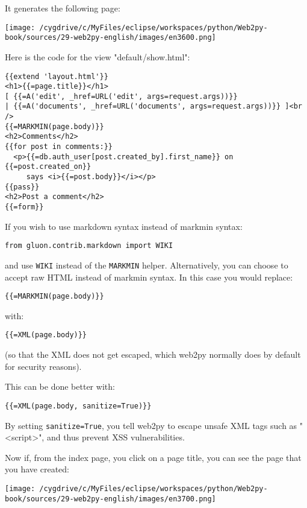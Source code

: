 \documentclass[justified,sixbynine,notoc]{tufte-book}
\def\ft{\small\tt}
\def\inxx#1{\index{#1}}
\begin{document}
\begin{fullwidth}
It generates the following page:


\goodbreak\begin{center}\texttt{[image: /cygdrive/c/MyFiles/eclipse/workspaces/python/Web2py-book/sources/29-web2py-english/images/en3600.png]}\end{center}


Here is the code for the view "default/show.html":

\inxx{markdown} \inxx{MARKMIN}
\begin{lstlisting}[keywords={}]
{{extend 'layout.html'}}
<h1>{{=page.title}}</h1>
[ {{=A('edit', _href=URL('edit', args=request.args))}}
| {{=A('documents', _href=URL('documents', args=request.args))}} ]<br />
{{=MARKMIN(page.body)}}
<h2>Comments</h2>
{{for post in comments:}}
  <p>{{=db.auth_user[post.created_by].first_name}} on {{=post.created_on}}
     says <i>{{=post.body}}</i></p>
{{pass}}
<h2>Post a comment</h2>
{{=form}}
\end{lstlisting}

If you wish to use markdown syntax instead of markmin syntax:

\begin{lstlisting}
from gluon.contrib.markdown import WIKI
\end{lstlisting}
\noindent and use {\ft WIKI} instead of the {\ft MARKMIN} helper.
Alternatively, you can choose to accept raw HTML instead of markmin syntax. In this case you would replace:
\begin{lstlisting}[keywords={}]
{{=MARKMIN(page.body)}}
\end{lstlisting}
\noindent with:
\begin{lstlisting}[keywords={}]
{{=XML(page.body)}}
\end{lstlisting}

\inxx{sanitize}
(so that the XML does not get escaped, which web2py normally does by default for security reasons).

This can be done better with:
\begin{lstlisting}[keywords={}]
{{=XML(page.body, sanitize=True)}}
\end{lstlisting}

By setting {\ft sanitize=True}, you tell web2py to escape unsafe XML tags such as "<script>", and thus prevent XSS vulnerabilities.

Now if, from the index page, you click on a page title, you can see the page that you have created:


\goodbreak\begin{center}\texttt{[image: /cygdrive/c/MyFiles/eclipse/workspaces/python/Web2py-book/sources/29-web2py-english/images/en3700.png]}\end{center}



\end{fullwidth}
\end{document}
